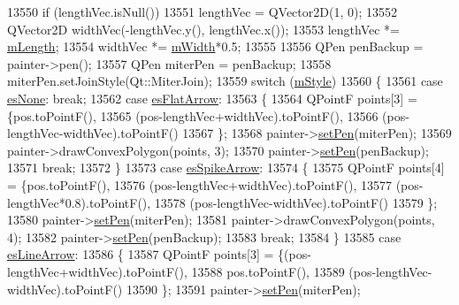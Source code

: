 \begin{DoxyCode}
13550   \textcolor{keywordflow}{if} (lengthVec.isNull())
13551     lengthVec = QVector2D(1, 0);
13552   QVector2D widthVec(-lengthVec.y(), lengthVec.x());
13553   lengthVec *= \hyperlink{a00046_ae8e1e2566b96c05736cd92662dba8af8}{mLength};
13554   widthVec *= \hyperlink{a00046_aca89d21341133c20dc6825c33a5eac48}{mWidth}*0.5;
13555   
13556   QPen penBackup = painter->pen();
13557   QPen miterPen = penBackup;
13558   miterPen.setJoinStyle(Qt::MiterJoin);
13559   \textcolor{keywordflow}{switch} (\hyperlink{a00046_a4696fc9117b60f1ca7690fcd2ba56611}{mStyle})
13560   \{
13561     \textcolor{keywordflow}{case} \hyperlink{a00046_a5ef16e6876b4b74959c7261d8d4c2cd5aca12d500f50cd6871766801bac30fb03}{esNone}: \textcolor{keywordflow}{break};
13562     \textcolor{keywordflow}{case} \hyperlink{a00046_a5ef16e6876b4b74959c7261d8d4c2cd5a3d7dcea2f100671727c3417142154f8f}{esFlatArrow}:
13563     \{
13564       QPointF points[3] = \{pos.toPointF(),
13565                            (pos-lengthVec+widthVec).toPointF(),
13566                            (pos-lengthVec-widthVec).toPointF()
13567                           \};
13568       painter->\hyperlink{a00047_af9c7a4cd1791403901f8c5b82a150195}{setPen}(miterPen);
13569       painter->drawConvexPolygon(points, 3);
13570       painter->\hyperlink{a00047_af9c7a4cd1791403901f8c5b82a150195}{setPen}(penBackup);
13571       \textcolor{keywordflow}{break};
13572     \}
13573     \textcolor{keywordflow}{case} \hyperlink{a00046_a5ef16e6876b4b74959c7261d8d4c2cd5ab9964d0d03f812d1e79de15edbeb2cbf}{esSpikeArrow}:
13574     \{
13575       QPointF points[4] = \{pos.toPointF(),
13576                            (pos-lengthVec+widthVec).toPointF(),
13577                            (pos-lengthVec*0.8).toPointF(),
13578                            (pos-lengthVec-widthVec).toPointF()
13579                           \};
13580       painter->\hyperlink{a00047_af9c7a4cd1791403901f8c5b82a150195}{setPen}(miterPen);
13581       painter->drawConvexPolygon(points, 4);
13582       painter->\hyperlink{a00047_af9c7a4cd1791403901f8c5b82a150195}{setPen}(penBackup);
13583       \textcolor{keywordflow}{break};
13584     \}
13585     \textcolor{keywordflow}{case} \hyperlink{a00046_a5ef16e6876b4b74959c7261d8d4c2cd5a61f78ee8f375fb21cb9d250687bbcbd2}{esLineArrow}:
13586     \{
13587       QPointF points[3] = \{(pos-lengthVec+widthVec).toPointF(),
13588                            pos.toPointF(),
13589                            (pos-lengthVec-widthVec).toPointF()
13590                           \};
13591       painter->\hyperlink{a00047_af9c7a4cd1791403901f8c5b82a150195}{setPen}(miterPen);

\end{DoxyCode}
